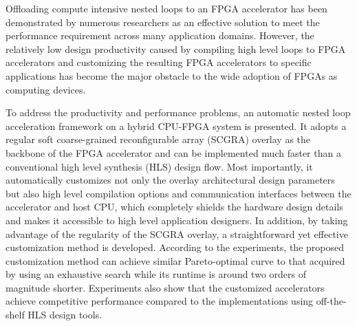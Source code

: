 Offloading compute intensive nested loops to an FPGA accelerator 
has been demonstrated by numerous researchers as an effective solution 
to meet the performance requirement across many application domains. 
However, the relatively low design productivity caused by compiling 
high level loops to FPGA accelerators and customizing 
the resulting FPGA accelerators to specific applications has become the major 
obstacle to the wide adoption of FPGAs as computing devices. 

To address the productivity and performance problems, an automatic 
nested loop acceleration framework on a hybrid CPU-FPGA system is 
presented. It adopts a regular soft coarse-grained 
reconfigurable array (SCGRA) overlay as the backbone of the FPGA 
accelerator and can be implemented much faster than a conventional 
high level synthesis (HLS) design flow. Most importantly, it 
automatically customizes not only the overlay architectural 
design parameters but also high level compilation options and 
communication interfaces between the accelerator and host CPU, 
which completely shields the hardware design details  
and makes it accessible to high level application designers. 
In addition, by taking advantage of the regularity of the 
SCGRA overlay, a straightforward yet effective customization 
method is developed. According to the experiments, the proposed 
customization method can achieve similar Pareto-optimal 
curve to that acquired by using an exhaustive search while 
its runtime is around two orders of magnitude shorter.
Experiments also show that the customized accelerators 
achieve competitive performance compared to the 
implementations using off-the-shelf HLS design tools. 

